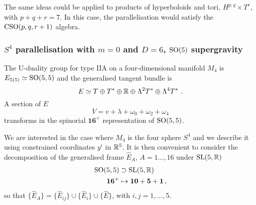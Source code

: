 \documentclass[debug]{phd}
\begin{document}
					The same ideas could be applied to products of hyperboloids and tori, $H^{p,q}\times T^r$, with $p+q+r=7$. 
					In this case, the parallelisation would satisfy the $\mathrm{CSO}(p,q,r+1)$ algebra.
			\subsubsection{\texorpdfstring{$S^4$ parallelisation with $m=0$ and $D=6$, $\mathrm{SO}(5)$ supergravity}{S4 parallelisation with m=0 and D=6, SO(5) supergravity}}
					The U-duality group for type IIA on a four-dimensional manifold $M_4$ is $E_{5(5)}\simeq \mathrm{SO}(5,5)$ and the generalised tangent bundle is
							\begin{equation}
								E \simeq T \oplus T^* \oplus \RR \oplus \Lambda^2 T^*\oplus \Lambda^4 T^*\ .
							\end{equation}
				A section of $E$
							\begin{equation}
								V = v + \lambda + \omega_0 + \omega_2 + \omega_4 
							\end{equation}
				transforms in the spinorial $\mathbf{16^+}$ representation of $\mathrm{SO}(5,5)$.

				We are interested in the case where $M_4$ is the four sphere $S^4$ and we describe it using constrained coordinates $y^i$ in $\mathbb{R}^5$.
				It is then convenient to consider the decomposition of the generalised frame $\hat{E}_A$, $A = 1\ldots,16$ under $\mathrm{SL}(5, \mathbb{R})$ 
							\begin{equation}
								\begin{split}
									\mathrm{SO}(5,5) &\supset \mathrm{SL}(5,\mathbb{R}) \\
									\mathbf{16^+} &\mapsto \mathbf{10} + \mathbf{5} + \mathbf{1} \, ,
								\end{split}
							\end{equation}
				so that $\{\hat{E}_{A}\} = \{\hat{E}_{ij}\} \cup \{\hat{E}_{i}\} \cup \{\hat{E}\}$, with $i,j=1,\ldots,5$.
\end{document}
